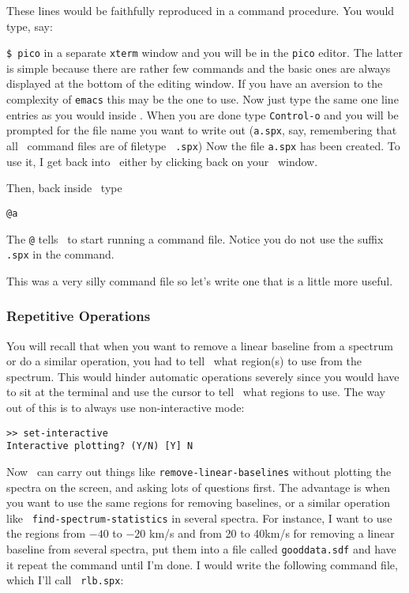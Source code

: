 These lines would be faithfully reproduced in a command procedure. 
You would type, say:

\verb|$ pico|
in a separate {\tt xterm} window and you will be in the {\tt pico}
editor. The latter is simple because there are rather few commands and
the basic ones are always displayed at the bottom of the editing
window. If you have an aversion to the complexity of {\tt emacs} this
may be the one to use. Now just type the same one line entries as you
would inside \SPECX . When you are done type {\tt Control-o} and you
will be prompted for the file name you want to write out ({\tt{a.spx}},
say, remembering that all \SPECX\ command files are of filetype {\tt
.spx}) Now the file {\tt a.spx} has been created.  To use it, I get
back into \SPECX\ either by clicking back on your \SPECX\ window.

Then, back inside \SPECX\ type

\verb|@a|

The {\tt @} tells \SPECX\ to start running a command file.  Notice you
do not use the suffix {\tt .spx} in the command.

This was a very silly command file so let's write one that is a little
more useful.


\subsubsection{Repetitive Operations}
\label{sec:specx_9.2}

You will recall that when you want to remove a linear baseline from a
spectrum or do a similar operation, you had to tell \SPECX\ what
region(s) to use from the spectrum.  This would hinder automatic
operations severely since you would have to sit at the terminal and
use the cursor to tell \SPECX\ what regions to use.  The way out of
this is to always use non-interactive mode:

\begin{verbatim}
>> set-interactive
Interactive plotting? (Y/N) [Y] N
\end{verbatim}

Now \SPECX\ can carry out things like {\tt remove-linear-baselines}
without plotting the spectra on the screen, and asking lots of
questions first.  The advantage is when you want to use the same
regions for removing baselines, or a similar operation like {\tt
find-spectrum-statistics} in several spectra.  For instance, I want to
use the regions from $-40$ to $-20$ km/s and from 20 to 40km/s for
removing a linear baseline from several spectra, put them into a file
called {\tt gooddata.sdf} and have it repeat the command until I'm
done.  I would write the following command file, which I'll call {\tt
rlb.spx}:

